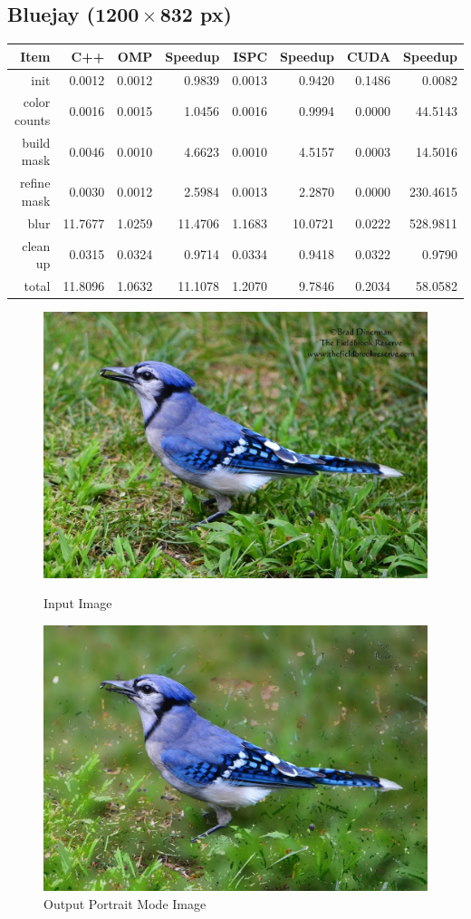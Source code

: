 \documentclass[12pt]{article}
\begin{document}
\subsection{Bluejay ($\mathbf{1200 \times 832}$ px)}

\begin{tabular}{r|r|r|r|r|r|r|r}
    Item & C++ & OMP & Speedup & ISPC & Speedup & CUDA & Speedup
\\  \hline
    init & 0.0012 & 0.0012 & 0.9839 & 0.0013 & 0.9420 & 0.1486 & 0.0082
\\  color counts & 0.0016 & 0.0015 & 1.0456 & 0.0016 & 0.9994 & 0.0000 & 44.5143
\\  build mask & 0.0046 & 0.0010 & 4.6623 & 0.0010 & 4.5157 & 0.0003 & 14.5016
\\  refine mask & 0.0030 & 0.0012 & 2.5984 & 0.0013 & 2.2870 & 0.0000 & 230.4615
\\  blur & 11.7677 & 1.0259 & 11.4706 & 1.1683 & 10.0721 & 0.0222 & 528.9811
\\  clean up & 0.0315 & 0.0324 & 0.9714 & 0.0334 & 0.9418 & 0.0322 & 0.9790
\\  \hline
    total & 11.8096 & 1.0632 & 11.1078 & 1.2070 & 9.7846 & 0.2034 & 58.0582
\end{tabular}

\begin{figure}[!htb]
    \begin{minipage}{0.48\textwidth}
        \centering
        \includegraphics[width=0.75\linewidth]{bluejay.jpg}
        \caption{Input Image}
    \end{minipage}\hfill
    \begin{minipage}{0.48\textwidth}
        \centering
        \includegraphics[width=0.75\linewidth]{bluejay_portrait.jpg}
        \caption{Output Portrait Mode Image}
    \end{minipage}\hfill
\end{figure}
\end{document}
